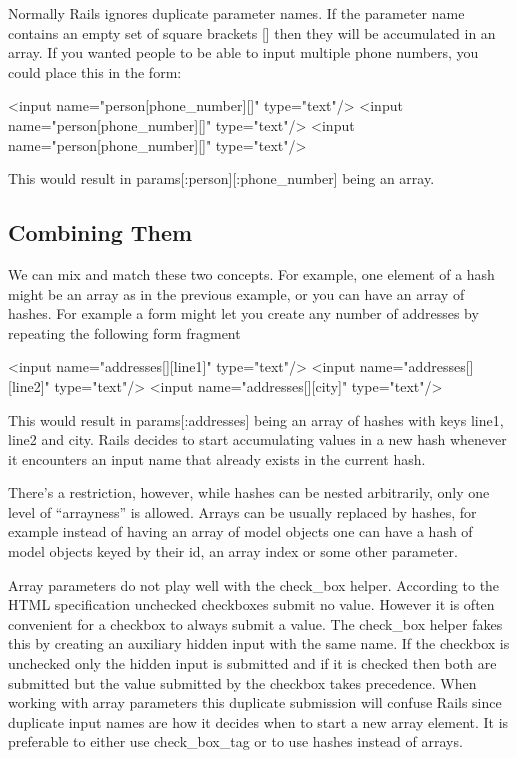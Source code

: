 \documentclass[10pt]{book}
\newenvironment{code}{%
  \scriptsize
    \verbatim
}{%
    \endverbatim
    \newline
}
\begin{document}
Normally Rails ignores duplicate parameter names. If the parameter  name contains an empty set of square brackets [] then they will be  accumulated in an array. If you wanted people to be able to input  multiple phone numbers, you could place this in the form:
\begin{code}
<input name="person[phone_number][]" type="text"/>
<input name="person[phone_number][]" type="text"/>
<input name="person[phone_number][]" type="text"/>
\end{code}

This would result in params[:person][:phone\_number] being an array.

\subsection{ Combining Them}

We can mix and match these two concepts. For example, one element of a  hash might be an array as in the previous example, or you can have an  array of hashes. For example a form might let you create any number of  addresses by repeating the following form fragment
\begin{code}
<input name="addresses[][line1]" type="text"/>
<input name="addresses[][line2]" type="text"/>
<input name="addresses[][city]" type="text"/>
\end{code}

This would result in params[:addresses] being an array of hashes with keys line1, line2 and city.  Rails decides to start accumulating values in a new hash whenever it  encounters an input name that already exists in the current hash.

There’s a restriction, however, while hashes can be nested  arbitrarily, only one level of “arrayness” is allowed. Arrays can be  usually replaced by hashes, for example instead of having an array of  model objects one can have a hash of model objects keyed by their id, an  array index or some other parameter.

Array parameters do not play well with the check\_box helper. According to the HTML  specification unchecked checkboxes submit no value. However it is often  convenient for a checkbox to always submit a value. The check\_box  helper fakes this by creating an auxiliary hidden input with the same  name. If the checkbox is unchecked only the hidden input is submitted  and if it is checked then both are submitted but the value submitted by  the checkbox takes precedence. When working with array parameters this  duplicate submission will confuse Rails since duplicate input names are  how it decides when to start a new array element. It is preferable to  either use check\_box\_tag or to use hashes instead of arrays.
\end{document}
